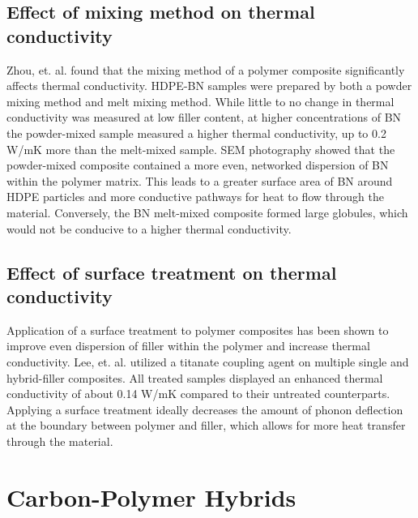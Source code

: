 \documentclass[11pt]{article}
\begin{document}
\begin{multicols}{2}
\subsection{Effect of mixing method on thermal conductivity}

Zhou, et. al. found that the mixing method of a polymer composite
significantly affects thermal conductivity. HDPE-BN samples were
prepared by both a powder mixing method and melt mixing method. While
little to no change in thermal conductivity was measured at low filler
content, at higher concentrations of BN the powder-mixed sample measured
a higher thermal conductivity, up to 0.2 W/mK more than the melt-mixed
sample. SEM photography showed that the powder-mixed composite contained
a more even, networked dispersion of BN within the polymer matrix. This
leads to a greater surface area of BN around HDPE particles and more
conductive pathways for heat to flow through the material. Conversely,
the BN melt-mixed composite formed large globules, which would not be
conducive to a higher thermal conductivity.

\subsection{Effect of surface treatment on thermal conductivity}

Application of a surface treatment to polymer composites has been shown
to improve even dispersion of filler within the polymer and increase
thermal conductivity. Lee, et. al. utilized a titanate coupling agent on
multiple single and hybrid-filler composites. All treated samples
displayed an enhanced thermal conductivity of about 0.14 W/mK compared
to their untreated counterparts.\cite{Lee-2006-727}  Applying a surface treatment
ideally decreases the amount of phonon deflection at the boundary
between polymer and filler, which allows for more heat transfer through
the material.

\section{Carbon-Polymer Hybrids}


\end{multicols}
\end{document}
